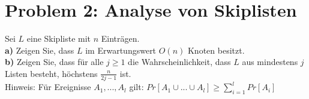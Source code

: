 \section*{{Problem 2: Analyse von Skiplisten}} 

Sei $L$ eine Skipliste mit $n$ Einträgen.\\

\textbf{a)} Zeigen Sie, dass $L$ im Erwartungswert $O(n)$ Knoten besitzt.\\



\textbf{b)} Zeigen Sie, dass für alle $j \geq 1$ die Wahrscheinlichkeit, dass $L$ aus mindestens $j$ Listen besteht, höchstens $\frac{n}{2j-1}$ ist.\\
Hinweis: Für Ereignisse $A_1,..., A_l$ gilt: $Pr[A_{1} \cup ... \cup A_{l}] \geq \sum_{i=1}^{l}Pr[A_i]$\\
 







